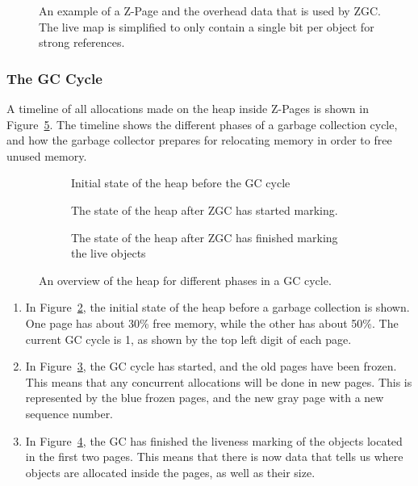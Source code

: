 \begin{figure}[H]
    \centering
    
    \caption[]
    {An example of a Z-Page and the overhead data that is used by ZGC. The live map is simplified to only contain a single bit per object for strong references.} 
    \label{fig:zpages}
\end{figure}

\subsubsection{The GC Cycle}

A timeline of all allocations made on the heap inside Z-Pages is shown in Figure~\ref{fig:zgc_timeline}. The timeline shows the different phases of a garbage collection cycle, and how the garbage collector prepares for relocating memory in order to free unused memory.

\begin{figure}[H]
    \centering
    \begin{subfigure}[t]{.214\textwidth}
        \centering
        
        \caption{Initial state of the heap before the GC cycle}
        \label{fig:zrel1}
    \end{subfigure}%
    \hfill\vline\hfill
    \begin{subfigure}[t]{.32\textwidth}
        \centering
        
        \caption{The state of the heap after ZGC has started marking.}
        \label{fig:zrel2}
    \end{subfigure}%
    \hfill\vline\hfill
    \begin{subfigure}[t]{.32\textwidth}
        \centering
        
        \caption{The state of the heap after ZGC has finished marking the live objects}
        \label{fig:zrel3}
    \end{subfigure}%
    \caption{An overview of the heap for different phases in a GC cycle.}
    \label{fig:zgc_timeline}
\end{figure}

\begin{enumerate}
    \item In Figure~\ref*{fig:zrel1}, the initial state of the heap before a garbage collection is shown. One page has about 30\% free memory, while the other has about 50\%. The current GC cycle is 1, as shown by the top left digit of each page.
    \item In Figure~\ref*{fig:zrel2}, the GC cycle has started, and the old pages have been frozen. This means that any concurrent allocations will be done in new pages. This is represented by the blue frozen pages, and the new gray page with a new sequence number.
    \item In Figure~\ref*{fig:zrel3}, the GC has finished the liveness marking of the objects located in the first two pages. This means that there is now data that tells us where objects are allocated inside the pages, as well as their size.
\end{enumerate}


